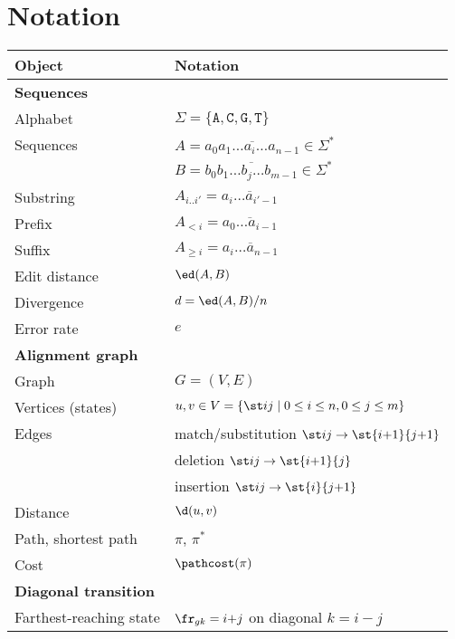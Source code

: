 \newcommand*{\tabindent}{\hspace{2mm}}

\section{Notation}\label{sec:notation}

\begin{tabular}[H]{ll}
  \toprule
  \textbf{Object}	         & \textbf{Notation}\\
  \midrule
  \textbf{Sequences}  & \\
  \tabindent Alphabet            	&
									$\Sigma = \{\mathtt A,\mathtt C,\mathtt G,\mathtt T\}$ \\
  \tabindent Sequences            &
									$A = \overline{a_0a_1 \dots a_i \dots a_{n-1}}\in \Sigma^*$\\
							 & $B = \overline{b_0b_1 \dots b_j \dots b_{m-1}} \in \Sigma^*$ \\
  \tabindent Substring          & $A_{i..i'} = \overline{a_i \dots a_{i'-1}}$ \\
  \tabindent Prefix & $A_{< i} = \overline{a_0 \dots a_{i-1}}$ \\
  \tabindent Suffix & $A_{\geq i} = \overline{a_i \dots a_{n-1}}$ \\
  \tabindent Edit distance        & $\ed(A,B)$\\
  \tabindent Divergence        & $d = \ed(A,B) / n$\\
  \tabindent Error rate        & $e$\\
  \midrule
  \textbf{Alignment graph} & \\
  \tabindent Graph& $G=(V,E)$\\
  \tabindent Vertices (states) & $u,v \in V=\{\st ij \mid 0\leq i\leq n, 0\leq j
								 \leq m\}$\\
  \tabindent Edges& match/substitution $\st ij \to \st {i{+}1}{j{+}1}$\\
							 & deletion $\st ij \to \st {i{+}1}{j}$\\
							 & insertion $\st ij \to \st {i}{j{+}1}$\\
  \tabindent Distance & $\d(u, v)$\\
  \tabindent Path, shortest path & $\pi$, $\pi^*$\\
  \tabindent Cost & $\pathcost(\pi)$\\
  \midrule
  \textbf{Diagonal transition} & \\
  \tabindent Farthest-reaching state & $\fr_{gk} = i{+}j$ on diagonal $k{=}i{-}j$ \\

\end{tabular}
